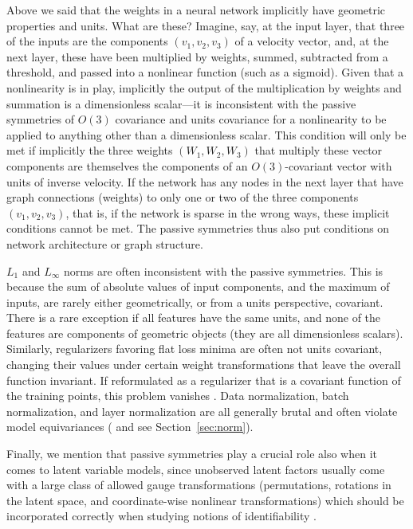 \documentclass[]{article} %
\newcommand{\sectionname}{Section}
\newcommand{\secref}[1]{\sectionname~\ref{#1}}
\begin{document}
Above we said that the weights in a neural network implicitly have geometric properties and units.
What are these?
Imagine, say, at the input layer, that three of the inputs are the components $(v_1, v_2, v_3)$ of a velocity vector, and, at the next layer, these have been multiplied by weights, summed, subtracted from a threshold, and passed into a nonlinear function (such as a sigmoid).
Given that a nonlinearity is in play, implicitly the output of the multiplication by weights and summation is a dimensionless scalar---it is inconsistent with the passive symmetries of $O(3)$ covariance and units covariance for a nonlinearity to be applied to anything other than a dimensionless scalar.
This condition will only be met if implicitly the three weights $(W_1, W_2, W_3)$ that multiply these vector components are themselves the components of an $O(3)$-covariant vector with units of inverse velocity.
If the network has any nodes in the next layer that have graph connections (weights) to only one or two of the three components $(v_1, v_2, v_3)$, that is, if the network is sparse in the wrong ways, these implicit conditions cannot be met.
The passive symmetries thus also put conditions on network architecture or graph structure.

$L_1$ and $L_\infty$ norms are often inconsistent with the passive symmetries.
This is because the sum of absolute values of input components, and the maximum of inputs, are rarely either geometrically, or from a units perspective, covariant.
There is a rare exception if all features have the same units, and none of the features are components of geometric objects (they are all dimensionless scalars).
Similarly, regularizers favoring flat loss minima \citep{flatminima,sharpminima,petzka2021relative} are often not units covariant, changing their values under certain weight transformations that leave the overall function invariant. 
If reformulated as a regularizer that is a covariant function of the training points, this problem vanishes \citep{LuxburgBS04}.
Data normalization, batch normalization, and layer normalization are all generally brutal and often violate model equivariances (\citealt{aalto2022geometric} and see \secref{sec:norm}).

Finally, we mention that passive symmetries play a crucial role also when it comes to latent variable models, since unobserved latent factors usually come with a large class of allowed gauge transformations (permutations, rotations in the latent space, and coordinate-wise nonlinear transformations) which should be incorporated correctly when studying notions of identifiability \citep{khemakhem2020ice, BucBesSch22}.
\end{document}
